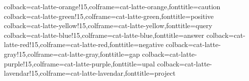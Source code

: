 %
{colback=cat-latte-orange!15,colframe=cat-latte-orange,fonttitle=\bfseries}{caution}
%
{colback=cat-latte-green!15,colframe=cat-latte-green,fonttitle=\bfseries}{positive}
%
{colback=cat-latte-yellow!15,colframe=cat-latte-yellow,fonttitle=\bfseries}{query}
%
{colback=cat-latte-blue!15,colframe=cat-latte-blue,fonttitle=\bfseries}{answer}
%
{colback=cat-latte-red!15,colframe=cat-latte-red,fonttitle=\bfseries}{negative}
%
{colback=cat-latte-gray!15,colframe=cat-latte-gray,fonttitle=\bfseries}{gap}
%
{colback=cat-latte-purple!15,colframe=cat-latte-purple,fonttitle=\bfseries}{upal}
%
{colback=cat-latte-lavendar!15,colframe=cat-latte-lavendar,fonttitle=\bfseries}{project}

\newcommand{\hlred}[1]{\sethlcolor{soulred}\hl{#1}}
\newcommand{\hlgreen}[1]{\sethlcolor{soulgreen}\hl{#1}}
\newcommand{\hlyellow}[1]{\sethlcolor{soulyellow}\hl{#1}}
\newcommand{\hlblue}[1]{\sethlcolor{soulblue}\hl{#1}}
\newcommand{\hlorange}[1]{\sethlcolor{soulorange}\hl{#1}}
\newcommand{\hlgray}[1]{\sethlcolor{soulgray}\hl{#1}}

\setul{}{1pt} %
\newcommand{\ulred}[1]{\setulcolor{cat-latte-red}\ul{#1}}
\newcommand{\ulgreen}[1]{\setulcolor{cat-latte-green}\ul{#1}}
\newcommand{\ulyellow}[1]{\setulcolor{cat-latte-yellow}\ul{#1}}
\newcommand{\ulblue}[1]{\setulcolor{cat-latte-blue}\ul{#1}}
\newcommand{\ulorange}[1]{\setulcolor{cat-latte-orange}\ul{#1}}
\newcommand{\ulgray}[1]{\setulcolor{cat-latte-gray}\ul{#1}}




